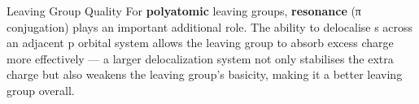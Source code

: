\documentclass[10pt]{article}
\begin{document}
\begin{core}{Leaving Group Quality}
    For \textbf{polyatomic} leaving groups, \textbf{resonance} (π conjugation) plays an important additional role. The ability to delocalise s across an adjacent p orbital system allows the leaving group to absorb excess charge more effectively --- a larger delocalization system not only stabilises the extra charge but also weakens the leaving group's basicity, making it a better leaving group overall.


  \end{core}
\end{document}
